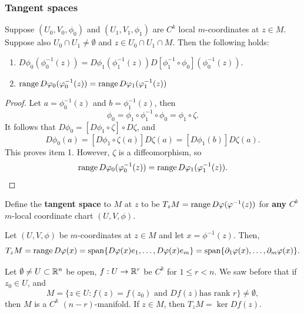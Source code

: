 \documentclass[a4paper]{article}
\begin{document}
\subsubsection{Tangent spaces}

\begin{lemma}
  Suppose $(U_0, V_0, \phi_0)$ and $(U_1, V_1, \phi_1)$ are $C^k$ local
  $m$-coordinates at $z \in M$. Suppose also $U_0 \cap U_1 \neq \emptyset$
  and $z \in U_0 \cap U_1 \cap M$. Then the following holds:
  \begin{enumerate}
    \item $D \phi_0 (\phi_0^{-1}(z)) = D\phi_1 (\phi_1^{-1}(z))
            D[\phi_1^{-1} \circ \phi_0] (\phi_0^{-1}(z))$.

    \item $\operatorname{range} D \varphi_0 (\varphi_0^{-1}(z)) = \operatorname{range} D\varphi_1
            (\varphi_1^{-1}(z))$
  \end{enumerate}
\end{lemma}

\begin{proof}
  Let $a = \phi_0^{-1}(z)$ and $b = \phi_1^{-1}(z)$, then
  \[
    \phi_0 = \phi_1 \circ \phi^{-1}_1 \circ \phi_0 = \phi_1 \circ
    \zeta.
  \]
  It follows that $D \phi_0 = [D \phi_1 \circ \zeta] \circ D \zeta$, and
  \[
    D \phi_0(a) = [D \phi_1 \circ \zeta(a)] D \zeta(a)
    = [D \phi_1 (b)] D \zeta(a).
  \]
  This proves item 1. However, $\zeta$ is a diffeomorphism, so
  \[
    \operatorname{range} D\varphi_0(\varphi_0^{-1} (z)) = \operatorname{range} D\varphi_1 (\varphi_1^{-1}(z)).
  \]
\end{proof}

\begin{defi}
  Define the \textbf{tangent space} to $M$
  at $z$ to be $T_z M = \operatorname{range} D\varphi (\varphi^{-1}(z))$
  for \textbf{any} $C^k$ $m$-local coordinate chart
  $(U, V, \phi)$.
\end{defi}

\begin{eg}
  Let $(U, V, \phi)$ be $m$-coordinates at $z \in M$ and let $x =
    \phi^{-1}(z)$. Then,
  \[
    T_z M = \operatorname{range} D\varphi(x) = \operatorname{span} \{D \varphi(x) e_1, \dots,
    D \varphi(x) e_m\} =
    \operatorname{span} \{\partial_1 \varphi(x), \dots, \partial_m \varphi(x)\}.
  \]
\end{eg}

\begin{thm}
  Let $\emptyset \neq U \subset \mathbb{R}^n$ be open, $f : U \to \mathbb{R}^r$ be $C^k$
  for $1 \leq r < n$. We saw before that if $z_0 \in U$, and
  \[
    M = \{z \in U : \text{$f(z) = f(z_0)$ and $Df(z)$
    has rank $r$}\} \neq \emptyset,
  \]
  then $M$ is a $C^k$ $(n - r)$-manifold. If $z \in M$, then $T_z M = \ker
  Df(z)$.
\end{thm}
\end{document}
